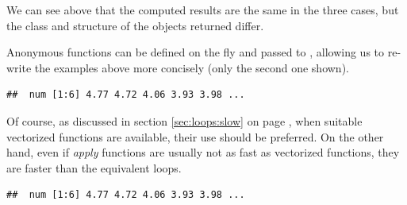 \documentclass[krantz2]{krantz}\usepackage{knitr}
\begin{document}
We can see above that the computed results are the same in the three cases, but the class and structure of the objects returned differ.

Anonymous functions can be defined on the fly and passed to , allowing us to re-write the examples above more concisely (only the second one shown).

\begin{knitrout}\footnotesize
{}\color{fgcolor}\begin{kframe}
\begin{alltt}
 \hlkwb{<-} \hlstd{(}   \hlstd{=} \hlstd{(}\hlstd{,} \hlstd{) \{} \hlopt{+}   \hlstd{=} \hlstd{)}
\end{alltt}
\begin{verbatim}
##  num [1:6] 4.77 4.72 4.06 3.93 3.98 ...
\end{verbatim}
\end{kframe}
\end{knitrout}

Of course, as discussed in section \ref{sec:loops:slow} on page \pageref{sec:loops:slow}, when suitable vectorized functions are available, their use should be preferred. On the other hand, even if \emph{apply} functions are usually not as fast as vectorized functions, they are faster than the equivalent  loops.

\begin{knitrout}\footnotesize
{}\color{fgcolor}\begin{kframe}
\begin{alltt}
 \hlkwb{<-}  \hlopt{+} 
\end{alltt}
\begin{verbatim}
##  num [1:6] 4.77 4.72 4.06 3.93 3.98 ...
\end{verbatim}
\end{kframe}
\end{knitrout}
\end{document}
